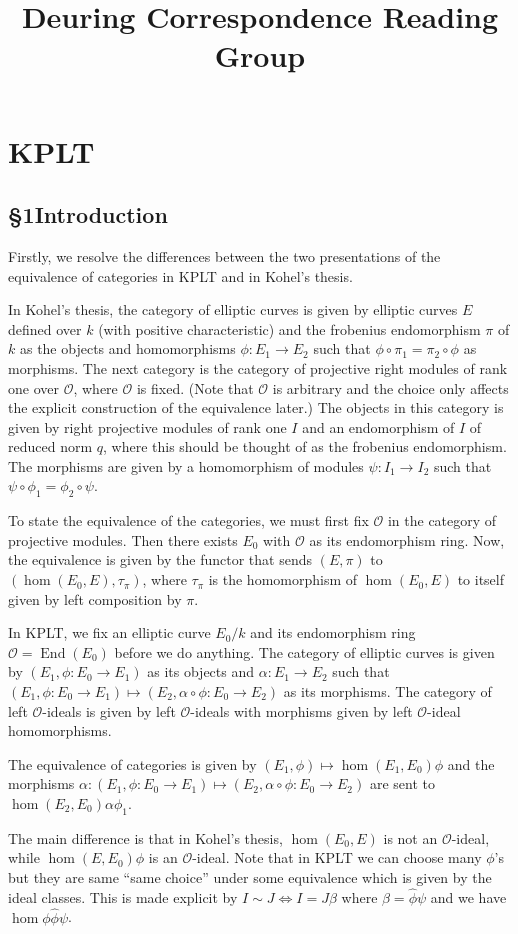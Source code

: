 \documentclass{amsart}
\title{Deuring Correspondence Reading Group}
\date{}
\theoremstyle{definition}\newtheorem*{defn}{Definition}
\theoremstyle{definition}\newtheorem*{eg}{Example}
\DeclareMathOperator{\End}{End}
\renewcommand{\O}{\mathcal{O}}
\begin{document}
\section{KPLT}
\subsection*{\S1\hspace{0.5cm}Introduction}
Firstly, we resolve the differences between the two presentations of the equivalence of categories in KPLT and in Kohel's thesis.

In Kohel's thesis, the category of elliptic curves is given by elliptic curves $E$ defined over $k$ (with positive characteristic) and the frobenius endomorphism $\pi$ of $k$ as the objects and homomorphisms $\phi:E_1\to E_2$ such that $\phi\circ\pi_1=\pi_2\circ\phi$ as morphisms. The next category is the category of projective right modules of rank one over $\O$, where $\O$ is fixed. (Note that $\O$ is arbitrary and the choice only affects the explicit construction of the equivalence later.) The objects in this category is given by right projective modules of rank one $I$ and an endomorphism of $I$ of reduced norm $q$, where this should be thought of as the frobenius endomorphism. The morphisms are given by a homomorphism of modules $\psi:I_1\to I_2$ such that $\psi\circ\phi_1=\phi_2\circ\psi$.

To state the equivalence of the categories, we must first fix $\O$ in the category of projective modules. Then there exists $E_0$ with $\O$ as its endomorphism ring. Now, the equivalence is given by the functor that sends $(E,\pi)$ to $(\hom(E_0,E),\tau_{\pi})$, where $\tau_{\pi}$ is the homomorphism of $\hom(E_0,E)$ to itself given by left composition by $\pi$.

In KPLT, we fix an elliptic curve $E_0/k$ and its endomorphism ring $\O=\End(E_0)$ before we do anything. The category of elliptic curves is given by $(E_1,\phi:E_0\to E_1)$ as its objects and $\alpha:E_1\to E_2$ such that $(E_1,\phi:E_0\to E_1)\mapsto(E_2,\alpha\circ\phi:E_0\to E_2)$ as its morphisms. The category of left $\O$-ideals is given by left $\O$-ideals with morphisms given by left $\O$-ideal homomorphisms.

The equivalence of categories is given by $(E_1,\phi)\mapsto \hom(E_1,E_0)\phi$ and the morphisms $\alpha:(E_1,\phi:E_0\to E_1)\mapsto(E_2,\alpha\circ\phi:E_0\to E_2)$ are sent to $\hom(E_2,E_0)\alpha\phi_1$.

The main difference is that in Kohel's thesis, $\hom(E_0,E)$ is not an $\O$-ideal, while $\hom(E,E_0)\phi$ is an $\O$-ideal. Note that in KPLT we can choose many $\phi$'s but they are same ``same choice'' under some equivalence which is given by the ideal classes. This is made explicit by $I\sim J\iff I=J\beta$ where $\beta=\hat{\phi}\psi$ and we have $\hom\phi\hat{\phi}\psi$.
\end{document}
